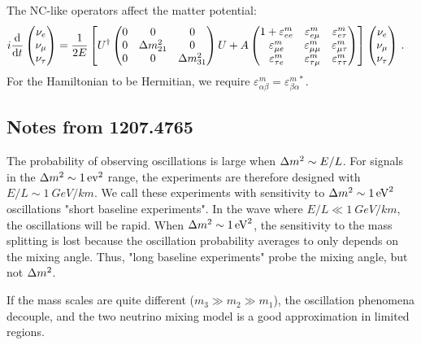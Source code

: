 \documentclass[twocolumn]{article}
\renewcommand{\a}{\ensuremath{\alpha}}
\renewcommand{\b}{\ensuremath{\beta}}
\renewcommand{\ne}{\ensuremath{\nu_e}}
\newcommand{\nm}{\ensuremath{\nu_\mu}}
\newcommand{\nt}{\ensuremath{\nu_\tau}}
\newcommand*{\dm}[1][]{%
  \Delta m^2\ifx\\#1\\\else_\text{#1}\fi
}
\begin{document}
The NC-like operators affect the matter potential:
\begin{align*}
  i \dv{}{t} \begin{pmatrix} 
                \ne \\ \nm \\ \nt
             \end{pmatrix}
  &= \frac{1}{2E} 
  \left[ 
    U^\dagger \begin{pmatrix} 
                0 & 0 & 0 \\
                0 & \dm[21] & 0 \\
                0 & 0 & \dm[31]
              \end{pmatrix} 
  U + A
    \begin{pmatrix} 
      1 + \varepsilon_{ee}^m & \varepsilon_{e\mu}^m & \varepsilon_{e\tau}^m   \\
     \varepsilon_{\mu e}^m   &\varepsilon_{\mu \mu}^m   &\varepsilon_{\mu \tau}^m   \\
     \varepsilon_{\tau e}^m   &\varepsilon_{\tau \mu}^m   &\varepsilon_{\tau \tau}^m  
    \end{pmatrix}
  \right]
  \begin{pmatrix} 
    \ne \\ \nm \\ \nt
  \end{pmatrix}
\,.\end{align*}
For the Hamiltonian to be Hermitian, we require $\varepsilon_{\a\b}^m = \varepsilon_{\b\a}^{m\,*} $.

\subsection*{Notes from 1207.4765}

The probability of observing oscillations is large when $\dm \sim E/L$. For signals in the $\dm \sim \SI{1}{ev^2}$ range, the experiments are therefore designed with $E/L \sim \SI{1}{GeV/km}$. We call these experiments with sensitivity to $\dm \sim \SI{1}{eV^2}$ oscillations "short baseline experiments". In the wave where $E/L \ll \SI{1}{GeV/km}$, the oscillations will be rapid. When $\dm \sim \SI{1}{eV^2}$, the sensitivity to the mass splitting is lost because the oscillation probability averages to only depends on the mixing angle. Thus, "long baseline experiments" probe the mixing angle, but not $\dm$.

If the mass scales are quite different ($m_3 \gg m_2 \gg m_1$), the oscillation phenomena decouple, and the two neutrino mixing model is a good approximation in limited regions. 
\end{document}
